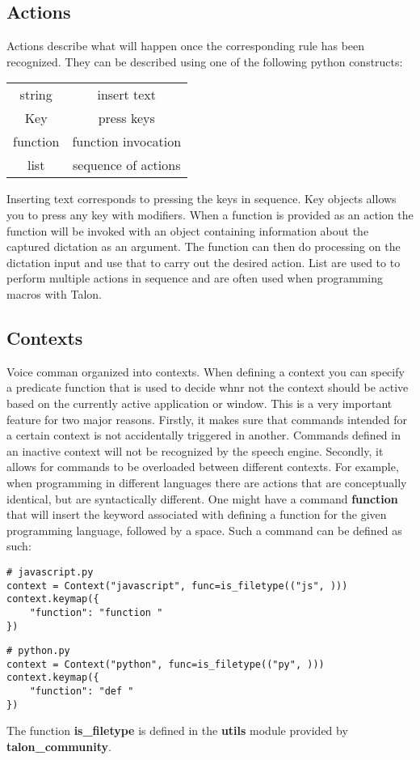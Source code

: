 \documentclass[a4paper,english]{ifimaster}
\begin{document}
\subsection{Actions}
Actions describe what will happen once the corresponding rule has been recognized.
They can be described using one of the following python constructs:
\begin{center}
\begin{tabular}{ c | c }
    string & insert text   \\
    Key & press keys   \\
    function & function invocation  \\
    list & sequence of actions   
\end{tabular}
\end{center}
Inserting text corresponds to pressing the keys in sequence.
Key objects allows you to press any key with modifiers.
When a function is provided as an action the function will be invoked with an object
containing information about the captured dictation as an argument.
The function can then do processing on the dictation input and use that to carry out the desired action.
List are used to to perform multiple actions in sequence and are often used when programming macros with Talon.

\subsection{Contexts}
Voice comman organized into contexts.
When defining a context you can specify a predicate function that is used to 
decide whnr not the context should be active based on the currently active
application or window.
This is a very important feature for two major reasons.
Firstly, it makes sure that commands intended for a certain context is not
accidentally triggered in another.
Commands defined in an inactive context will not be recognized by the speech engine.
Secondly, it allows for commands to be overloaded between different contexts.
For example, when programming in different languages there are actions
that are conceptually identical, but are syntactically different.
One might have a command \textbf{function} that will insert the keyword associated with
defining a function for the given programming language, followed by a space.
Such a command can be defined as such:
\begin{verbatim}
# javascript.py
context = Context("javascript", func=is_filetype(("js", )))
context.keymap({
    "function": "function "
})
\end{verbatim}
\begin{verbatim}
# python.py
context = Context("python", func=is_filetype(("py", )))
context.keymap({
    "function": "def "
})
\end{verbatim}
The function \textbf{is\_filetype} is defined in the \textbf{utils} module provided by \textbf{talon\_community}.
\end{document}

